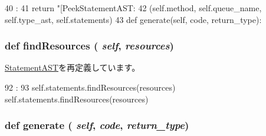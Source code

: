 \begin{DoxyCode}
40                       :
41         return "[PeekStatementAST: %
42                (self.method, self.queue_name, self.type_ast, self.statements)
43 
    def generate(self, code, return_type):
\end{DoxyCode}
\hypertarget{classslicc_1_1ast_1_1PeekStatementAST_1_1PeekStatementAST_abd195c795639b490ba2de4c1246105f1}{
\subsubsection[{findResources}]{\setlength{\rightskip}{0pt plus 5cm}def findResources ( {\em self}, \/   {\em resources})}}
\label{classslicc_1_1ast_1_1PeekStatementAST_1_1PeekStatementAST_abd195c795639b490ba2de4c1246105f1}


\hyperlink{classslicc_1_1ast_1_1StatementAST_1_1StatementAST_abd195c795639b490ba2de4c1246105f1}{StatementAST}を再定義しています。


\begin{DoxyCode}
92                                       :
93         self.statements.findResources(resources)
        self.statements.findResources(resources)
\end{DoxyCode}
\hypertarget{classslicc_1_1ast_1_1PeekStatementAST_1_1PeekStatementAST_a4555d1cee0dccf3942ea35fe86de2e8e}{
\subsubsection[{generate}]{\setlength{\rightskip}{0pt plus 5cm}def generate ( {\em self}, \/   {\em code}, \/   {\em return\_\-type})}}
\label{classslicc_1_1ast_1_1PeekStatementAST_1_1PeekStatementAST_a4555d1cee0dccf3942ea35fe86de2e8e}



